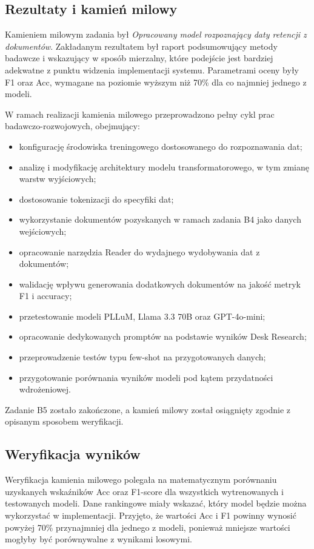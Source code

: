 \documentclass[12pt,a4paper]{report}
\begin{document}
\subsection{Rezultaty i kamień milowy}
Kamieniem milowym zadania był \textit{Opracowany model rozpoznający daty retencji z dokumentów}. Zakładanym rezultatem był raport podsumowujący metody badawcze i wskazujący w sposób mierzalny, które podejście jest bardziej adekwatne z punktu widzenia implementacji systemu. Parametrami oceny były F1 oraz Acc, wymagane na poziomie wyższym niż 70\% dla co najmniej jednego z modeli.

W ramach realizacji kamienia milowego przeprowadzono pełny cykl prac badawczo-rozwojowych, obejmujący:

\begin{itemize}
    \item konfigurację środowiska treningowego dostosowanego do rozpoznawania dat;
    \item analizę i modyfikację architektury modelu transformatorowego, w tym zmianę warstw wyjściowych;
    \item dostosowanie tokenizacji do specyfiki dat;
    \item wykorzystanie dokumentów pozyskanych w ramach zadania B4 jako danych wejściowych;
    \item opracowanie narzędzia Reader do wydajnego wydobywania dat z dokumentów;
    \item walidację wpływu generowania dodatkowych dokumentów na jakość metryk F1 i accuracy;
    \item przetestowanie modeli PLLuM, Llama 3.3 70B oraz GPT-4o-mini;
    \item opracowanie dedykowanych promptów na podstawie wyników Desk Research;
    \item przeprowadzenie testów typu few-shot na przygotowanych danych;
    \item przygotowanie porównania wyników modeli pod kątem przydatności wdrożeniowej.
\end{itemize}

Zadanie B5 zostało zakończone, a kamień milowy został osiągnięty zgodnie z opisanym sposobem weryfikacji.

\subsection{Weryfikacja wyników}
Weryfikacja kamienia milowego polegała na matematycznym porównaniu uzyskanych wskaźników Acc oraz F1-score dla wszystkich wytrenowanych i testowanych modeli. Dane rankingowe miały wskazać, który model będzie można wykorzystać w implementacji. Przyjęto, że wartości Acc i F1 powinny wynosić powyżej 70\% przynajmniej dla jednego z modeli, ponieważ mniejsze wartości mogłyby być porównywalne z wynikami losowymi.
\end{document}
